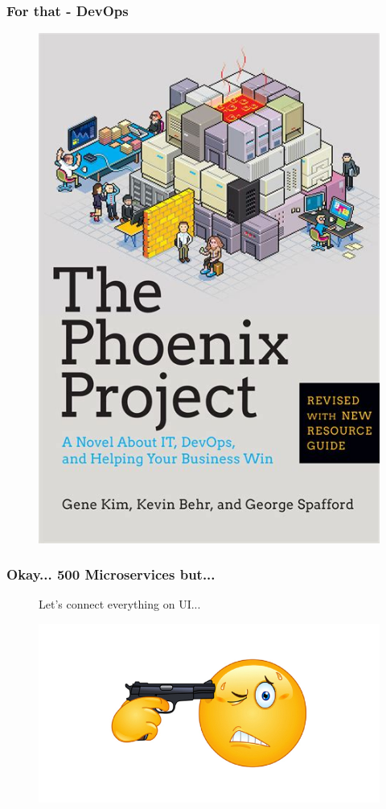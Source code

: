 \begin{frame}
\frametitle{For that - DevOps}
\begin{figure}
	\centering
	\includegraphics[width=0.4\linewidth]{pictures/fenix.jpeg}
\end{figure}


\end{frame}




\begin{frame}
\frametitle{Okay... 500 Microservices but...}
\begin{figure}
Let's connect everything on UI...\pause
\end{figure}
\begin{figure}
	\centering
	\includegraphics[width=0.7\linewidth]{pictures/killme}
	\label{fig:killme}
\end{figure}


\end{frame}
